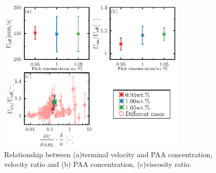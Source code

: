 \begin{figure}[H]
    \includegraphics[width=0.8\textwidth]{X-Appendix/concentration_diff/concentration_diff_cal.eps}
    \caption{Relationship between (a)terminal velocity and PAA concentration, velocity ratio and (b) PAA concentration, (c)viscosity ratio.}
    \label{fig:95-105_cal}
\end{figure}
